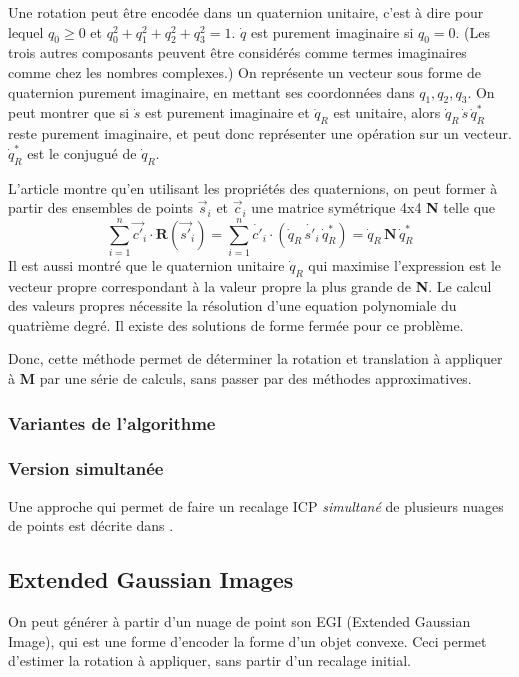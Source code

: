 \documentclass[a4paper,10pt]{scrreprt}
\begin{document}
Une rotation peut être encodée dans un quaternion unitaire, c'est à dire pour lequel $q_0 \geq 0$ et $q_0^2 + q_1^2 + q_2^2 + q_3^2 = 1$. $\dot{q}$ est purement imaginaire si $q_0 = 0$. (Les trois autres composants peuvent être considérés comme termes imaginaires comme chez les nombres complexes.) On représente un vecteur sous forme de quaternion purement imaginaire, en mettant ses coordonnées dans $q_1, q_2, q_3$. On peut montrer que si $\dot{s}$ est purement imaginaire et $\dot{q}_R$ est unitaire, alors $\dot{q}_R \, \dot{s} \, \dot{q}^*_R$ reste purement imaginaire, et peut donc représenter une opération sur un vecteur. $\dot{q}^*_R$ est le conjugué de $\dot{q}_R$.

L'article \cite{Horn1986} montre qu'en utilisant les propriétés des quaternions, on peut former à partir des ensembles de points $\vec{s}_i$ et $\vec{c}_i$ une matrice symétrique 4x4 \textbf{N} telle que
\begin{equation}
	\sum_{i=1}^{n} \vec{c'}_{i} \cdot \mathbf{R}(\vec{s'}_i) =
	\sum_{i=1}^{n} \dot{c'}_{i} \cdot (\dot{q}_R \, \dot{s'}_{i} \, \dot{q}^*_R) =
	\dot{q}_R \, \mathbf{N} \, \dot{q}^*_R
\end{equation}
Il est aussi montré que le quaternion unitaire $\dot{q}_R$ qui maximise l'expression est le vecteur propre correspondant à la valeur propre la plus grande de \textbf{N}. Le calcul des valeurs propres nécessite la résolution d'une equation polynomiale du quatrième degré. Il existe des solutions de forme fermée pour ce problème.

Donc, cette méthode permet de déterminer la rotation et translation à appliquer à \textbf{M} par une série de calculs, sans passer par des méthodes approximatives.


\subsubsection{Variantes de l'algorithme}



\subsubsection{Version simultanée}
Une approche qui permet de faire un recalage ICP \emph{simultané} de plusieurs nuages de points est décrite dans \cite{Told2010}.

\subsection{Extended Gaussian Images}
On peut générer à partir d'un nuage de point son EGI (Extended Gaussian Image), qui est une forme d'encoder la forme d'un objet convexe. Ceci permet d'estimer la rotation à appliquer, sans partir d'un recalage initial.




\end{document}
